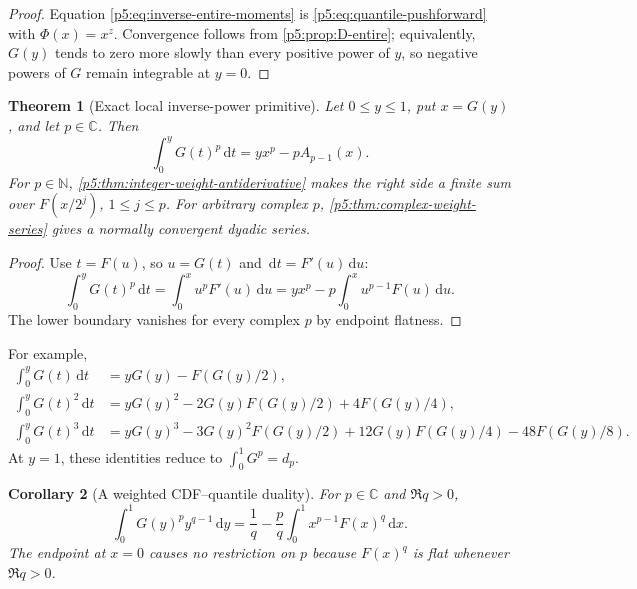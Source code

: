 \documentclass[11pt,oneside]{article}
\newtheorem{theorem}{Theorem}[section]
\newtheorem{corollary}[theorem]{Corollary}
\theoremstyle{definition}
\theoremstyle{remark}
\newcommand{\C}{\mathbb C}
\newcommand{\N}{\mathbb N}
\newcommand{\dd}{\,\mathrm d}
\newcommand{\1}{\mathbf 1}
\begin{document}
\begin{proof}
Equation \eqref{p5:eq:inverse-entire-moments} is \eqref{p5:eq:quantile-pushforward} with $\Phi(x)=x^z$.  Convergence follows from \cref{p5:prop:D-entire}; equivalently, $G(y)$ tends to zero more slowly than every positive power of $y$, so negative powers of $G$ remain integrable at $y=0$.
\end{proof}

\begin{theorem}[Exact local inverse-power primitive]\label{p5:thm:inverse-local-primitive}
Let $0\le y\le1$, put $x=G(y)$, and let $p\in\C$.  Then
\begin{equation}\label{p5:eq:inverse-local-primitive}
\boxed{
 \int_0^yG(t)^p\dd t
 =y x^p-pA_{p-1}(x).}
\end{equation}
For $p\in\N$, \cref{p5:thm:integer-weight-antiderivative} makes the right side a finite sum over $F(x/2^j)$, $1\le j\le p$.  For arbitrary complex $p$, \cref{p5:thm:complex-weight-series} gives a normally convergent dyadic series.
\end{theorem}

\begin{proof}
Use $t=F(u)$, so $u=G(t)$ and $\dd t=F'(u)\dd u$:
\[
 \int_0^yG(t)^p\dd t
 =\int_0^xu^pF'(u)\dd u
 =yx^p-p\int_0^xu^{p-1}F(u)\dd u.
\]
The lower boundary vanishes for every complex $p$ by endpoint flatness.
\end{proof}

For example,
\begin{align}
 \int_0^yG(t)\dd t
 &=yG(y)-F(G(y)/2),\label{p5:eq:inverse-primitive-p1}\\
 \int_0^yG(t)^2\dd t
 &=yG(y)^2-2G(y)F(G(y)/2)+4F(G(y)/4),\label{p5:eq:inverse-primitive-p2}\\
 \int_0^yG(t)^3\dd t
 &=yG(y)^3-3G(y)^2F(G(y)/2)
 +12G(y)F(G(y)/4)-48F(G(y)/8).
\end{align}
At $y=1$, these identities reduce to $\int_0^1G^p=d_p$.

\begin{corollary}[A weighted CDF--quantile duality]\label{p5:cor:weighted-quantile-duality}
For $p\in\C$ and $\Re q>0$,
\begin{equation}\label{p5:eq:weighted-quantile-duality}
 \int_0^1G(y)^p y^{q-1}\dd y
 =\frac1q-\frac pq\int_0^1x^{p-1}F(x)^q\dd x.
\end{equation}
The endpoint at $x=0$ causes no restriction on $p$ because $F(x)^q$ is flat whenever $\Re q>0$.
\end{corollary}
\end{document}
